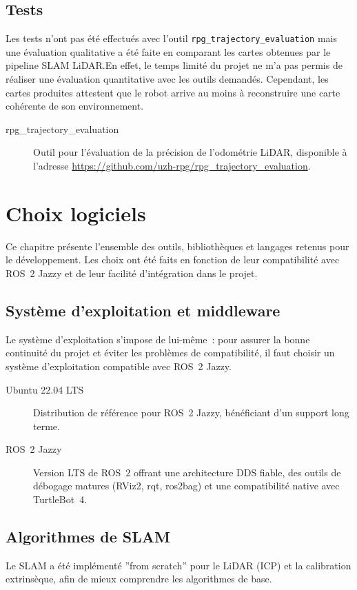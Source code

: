 \documentclass[12pt,a4paper]{report}
\begin{document}
\section{Tests}
Les tests n'ont pas été effectués avec l'outil
\texttt{rpg\_trajectory\_evaluation} mais une évaluation qualitative a été
faite en comparant les cartes obtenues par le pipeline SLAM LiDAR.\@ En effet,
le temps limité du projet ne m'a pas permis de réaliser une évaluation
quantitative avec les outils demandés. Cependant, les cartes produites
attestent que le robot arrive au moins à reconstruire une carte cohérente de
son environnement.
\begin{description}
  \item[rpg\_trajectory\_evaluation] Outil pour l'évaluation de la précision de
        l'odométrie LiDAR, disponible à l'adresse
        \url{https://github.com/uzh-rpg/rpg_trajectory_evaluation}.
\end{description}

\chapter{Choix logiciels}
Ce chapitre présente l'ensemble des outils, bibliothèques et langages retenus
pour le développement. Les choix ont été faits en fonction de leur
compatibilité avec ROS~2 Jazzy et de leur facilité d'intégration dans le
projet.

\section{Système d'exploitation et middleware}
Le système d'exploitation s'impose de lui-même~: pour assurer la bonne
continuité du projet et éviter les problèmes de compatibilité, il faut choisir
un système d'exploitation compatible avec ROS~2 Jazzy.

\begin{description}
  \item[Ubuntu 22.04 LTS] Distribution de référence pour ROS~2 Jazzy, bénéficiant d'un
        support long terme.
  \item[ROS~2 Jazzy] Version LTS de ROS~2 offrant une architecture DDS fiable, des
        outils de débogage matures (RViz2, rqt, ros2bag) et une compatibilité native
        avec TurtleBot~4.
\end{description}

\section{Algorithmes de SLAM}
Le SLAM a été implémenté ''from scratch'' pour le LiDAR (ICP) et la calibration
extrinsèque, afin de mieux comprendre les algorithmes de base.
\end{document}
